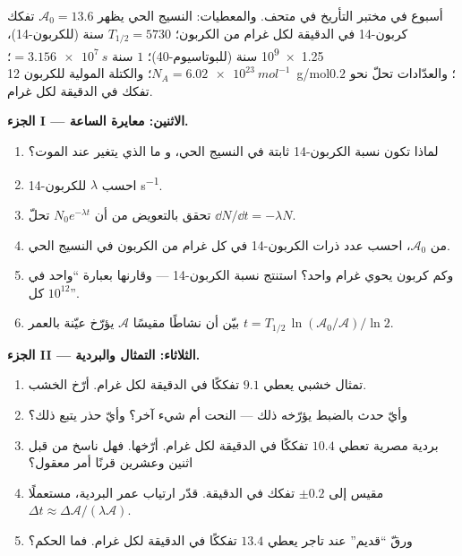 \begin{problem}
\label{pb:g12:radioactive-decay:1}
أسبوع في مختبر التأريخ في متحف. والمعطيات: النسيج الحي يظهر
$\mathcal A_0 = 13.6$ تفكك كربون-14 في الدقيقة لكل غرام من الكربون؛
$T_{1/2} = \num{5730}$ سنة (للكربون-14)، \num{1.25e9} سنة
(للبوتاسيوم-40)؛ $1$ سنة $= \qty{3.156e7}{s}$؛
$N_A = \qty{6.02e23}{mol^{-1}}$؛ والكتلة المولية للكربون \qty{12}{g/mol}؛
والعدّادات تحلّ نحو $0.2$ تفكك في الدقيقة لكل غرام.

\medskip
\noindent\textbf{الجزء I --- الاثنين: معايرة الساعة.}
\begin{enumerate}
  \item لماذا تكون نسبة الكربون-14 ثابتة في النسيج الحي، و
        ما الذي يتغير عند الموت؟
  \item احسب $\lambda$ للكربون-14  \unit{s^{-1}}.
  \item تحقق بالتعويض من أن $N_0 e^{-\lambda t}$ تحلّ
        $\dd N/\dd t = -\lambda N$.
  \item من $\mathcal A_0$، احسب عدد ذرات الكربون-14 في كل
        غرام من الكربون في النسيج الحي.
  \item وكم  كربون يحوي غرام واحد؟ استنتج نسبة الكربون-14
        --- وقارنها بعبارة ``واحد في كل $10^{12}$''.
  \item بيّن أن نشاطًا مقيسًا $\mathcal A$ يؤرّخ عيّنة بالعمر
        $t = T_{1/2}\,\ln(\mathcal A_0/\mathcal A)/\ln 2$.
\end{enumerate}

\medskip
\noindent\textbf{الجزء II --- الثلاثاء: التمثال والبردية.}
\begin{enumerate}[resume]
  \item تمثال خشبي يعطي $9.1$ تفككًا في الدقيقة لكل غرام. أرّخ
        الخشب.
  \item وأيّ حدث بالضبط يؤرّخه ذلك --- النحت أم
        شيء آخر؟ وأيّ حذر يتبع ذلك؟
  \item بردية مصرية تعطي $10.4$ تفككًا في الدقيقة لكل غرام. أرّخها.
        فهل ناسخ من قبل اثنين وعشرين قرنًا أمر معقول؟
  \item {} مقيس إلى $\pm 0.2$ تفكك في الدقيقة. قدّر
        ارتياب عمر البردية، مستعملًا
        $\Delta t \approx \Delta\mathcal A/(\lambda \mathcal A)$.
  \item ورقّ ``قديم'' عند تاجر يعطي $13.4$ تفككًا في الدقيقة
        لكل غرام. فما الحكم؟
\end{enumerate}


\end{problem}
